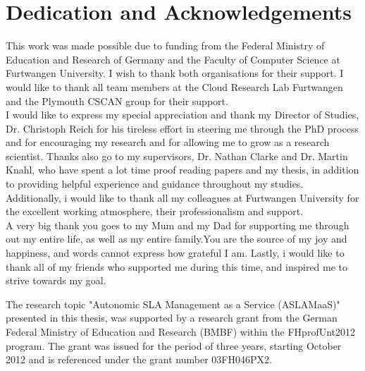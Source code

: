 %
%

\chapter*{Dedication and Acknowledgements}
\begin{SingleSpace}
This work was made possible due to funding from the Federal Ministry of Education and Research of Germany and the Faculty of Computer Science at Furtwangen University. I wish to thank both organisations for their support. I would like to thank all team members at the Cloud Research Lab Furtwangen and the Plymouth CSCAN group for their support.\\

I would like to express my special appreciation and thank my Director of Studies, Dr. Christoph Reich for his tireless effort in steering me through the PhD process and for encouraging my research and for allowing me to grow as a research scientist.  Thanks also go to my supervisors, Dr. Nathan Clarke and Dr. Martin Knahl, who have spent a lot time proof reading papers and my thesis, in addition to providing helpful experience and guidance throughout my studies.  Additionally, i would like to thank all my colleagues at Furtwangen University for the excellent working atmosphere, their professionalism and support. \\

A very big thank you goes to my Mum and my Dad  for supporting me through out my entire life, as well as my entire family.You are the source of my joy and happiness, and words cannot express how grateful I am. Lastly, i would  like to thank all of my friends who supported me during this time, and inspired me to strive towards my goal. 


The research topic "Autonomic SLA Management as a Service (ASLAMaaS)" presented in this thesis, was supported by a research grant from the German Federal Ministry of Education and Research (BMBF) within the FHprofUnt2012 program. The grant was issued for the period of three years, starting October 2012 and is referenced under the grant number 03FH046PX2.\cite{ASLAMaaS}
\end{SingleSpace}
\clearpage

